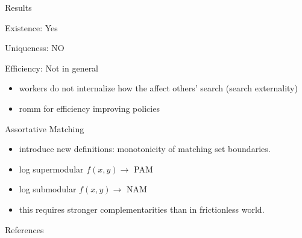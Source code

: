 \documentclass{beamer}%
\begin{document}
\begin{frame}{Results}
\begin{midi}
\item Existence: Yes \cite{10.2307/2999430}
\item Uniqueness: NO
\item Efficiency: Not in general
\begin{itemize}
\item workers do not internalize how the affect others' search (search externality)
\item romm for efficiency improving policies
\end{itemize}
\item Assortative Matching
\begin{itemize}
\item \cite{10.2307/2999430} introduce new definitions: monotonicity of matching set boundaries.
\item log supermodular $f(x,y)\rightarrow $ PAM
\item log submodular $f(x,y)\rightarrow $ NAM
\item this requires stronger complementarities than in frictionless world.
\end{itemize}
\end{midi}

\end{frame}

\begin{frame}[allowframebreaks]{References}
		
		
\end{frame}
\end{document}
